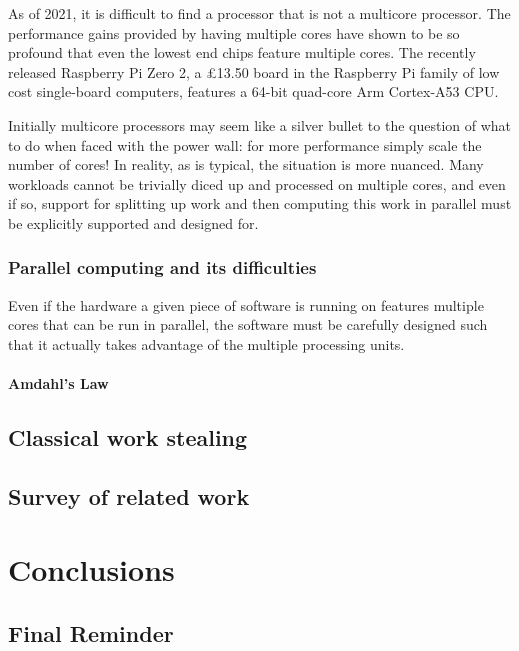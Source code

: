 \documentclass[bsc,frontabs,singlespacing,parskip,deptreport,normalheadings]{infthesis}
\begin{document}
As of 2021, it is difficult to find a processor that is not a multicore
processor. The performance gains provided by having multiple cores have shown to
be so profound that even the lowest end chips feature multiple cores. The
recently released Raspberry Pi Zero 2, a \pounds13.50 board in the Raspberry Pi
family of low cost single-board computers, features a 64-bit quad-core Arm Cortex-A53
CPU.

Initially multicore processors may seem like a silver bullet to the question of
what to do when faced with the power wall: for more performance simply scale the
number of cores! In reality, as is typical, the situation is more nuanced. Many
workloads cannot be trivially diced up and processed on multiple cores, and even
if so, support for splitting up work and then computing this work in parallel
must be explicitly supported and designed for.

\subsection{Parallel computing and its difficulties}

Even if the hardware a given piece of software is running on features multiple
cores that can be run in parallel, the software must be carefully designed such
that it actually takes advantage of the multiple processing units. 

\subsubsection{Amdahl's Law}

\section{Classical work stealing}

\section{Survey of related work}


\chapter{Conclusions}

\section{Final Reminder}
\end{document}
